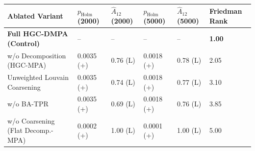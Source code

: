 \begin{tabular}{llllll}
\toprule
Ablated Variant & $p_{\mathrm{Holm}}$ (2000) & $\hat{A}_{12}$ (2000) & $p_{\mathrm{Holm}}$ (5000) & $\hat{A}_{12}$ (5000) & Friedman Rank \\
\midrule
\textbf{Full HGC-DMPA (Control)} & -- & -- & -- & -- & \textbf{1.00} \\
w/o Decomposition (HGC-MPA) & 0.0035 (+) & 0.76 (L) & 0.0018 (+) & 0.78 (L) & 2.05 \\
Unweighted Louvain Coarsening & 0.0035 (+) & 0.74 (L) & 0.0018 (+) & 0.77 (L) & 3.10 \\
w/o BA-TPR & 0.0035 (+) & 0.69 (L) & 0.0018 (+) & 0.76 (L) & 3.85 \\
w/o Coarsening (Flat Decomp.-MPA) & 0.0002 (+) & 1.00 (L) & 0.0001 (+) & 1.00 (L) & 5.00 \\
\bottomrule
\end{tabular}
